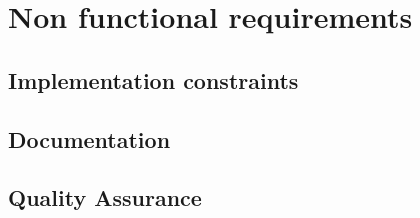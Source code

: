\section{Non functional requirements}
\label{sec:non-functional}


\subsection{Implementation constraints}

\subsection{Documentation}

\subsection{Quality Assurance}